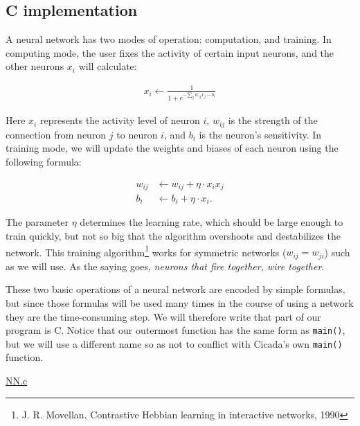 \documentclass{article}
\begin{document}
\subsection{C implementation}

A neural network has two modes of operation:  computation, and training.  In computing mode, the user fixes the activity of certain input neurons, and the other neurons $x_i$ will calculate:

\begin{align*}
x_i \leftarrow \frac1{1 + e^{-\sum_j w_{ij} x_j - b_i}}
\end{align*}

\noindent Here $x_i$ represents the activity level of neuron $i$, $w_{ij}$ is the strength of the connection from neuron $j$ to neuron $i$, and $b_i$ is the neuron's sensitivity.  In training mode, we will update the weights and biases of each neuron using the following formula:

\begin{align*}
w_{ij} &\leftarrow w_{ij} + \eta \cdot x_i x_j\\
b_i &\leftarrow b_i + \eta \cdot x_i.
\end{align*}

\noindent The parameter $\eta$ determines the learning rate, which should be large enough to train quickly, but not so big that the algorithm overshoots and destabilizes the network.  This training algorithm\footnote{J. R. Movellan, Contrastive Hebbian learning in interactive networks, 1990} works for symmetric networks ($w_{ij} = w_{ji}$) such as we will use.  As the saying goes, \emph{neurons that fire together, wire together}.

These two basic operations of a neural network are encoded by simple formulas, but since those formulas will be used many times in the course of using a network they are the time-consuming step.  We will therefore write that part of our program is C.  Notice that our outermost function has the same form as \verb#main()#, but we will use a different name so as not to conflict with Cicada's own \verb#main()# function.\\\vspace{.2in}


\noindent \underline{NN.c}
\end{document}

